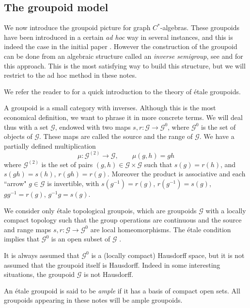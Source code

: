\documentclass[11pt]{amsart}
\theoremstyle{plain}            %
\theoremstyle{definition}       %
\theoremstyle{definition}       %
\theoremstyle{remark}
\begin{document}
\subsection{The groupoid model}

We now introduce the groupoid picture for graph $C^*$-algebras. These groupoids have been introduced in a certain {\it ad hoc} way in several instances, and this is indeed the case in the initial paper \cite{kprr97}. However the construction of the groupoid can be done from an algebraic structure called an {\it inverse semigroup}, see \cite{Exel08} and \cite{ExelBook} for this approach. This is the most satisfying way to build this structure, but we will restrict to the ad hoc method in these notes. 

We refer the reader to \cite{SimsCRMNotes} for a quick introduction to the theory of étale groupoids. 

A groupoid is a small category with inverses. Although this is the most economical definition, we want to phrase it in more concrete terms. We will deal thus with a set $\mathcal G$, endowed with two maps
$s,r\colon \mathcal G \to \mathcal G^0$, where $\mathcal G^0$ is the set of objects of $\mathcal G$. These maps are called the source and the range of $\mathcal G$. We have a partially defined multiplication 
$$\mu\colon \mathcal G ^{(2)}\to \mathcal G, \qquad \mu (g,h)= gh$$
where $\mathcal G ^{(2)}$ is the set of pairs $(g,h)\in \mathcal G\times \mathcal G$ such that $s(g)= r(h)$, and $s(gh)= s(h)$, $r(gh) = r(g)$. Moreover the product is associative and each ``arrow" $g\in \mathcal G$
is invertible, with $s(g^{-1})= r(g)$, $r(g^{-1})= s(g)$, $gg^{-1}= r(g)$, $g^{-1}g = s(g)$.  

We consider only étale topological groupois, which are groupoids $\mathcal G$ with a locally compact topology
such that the group operations are continuous and the source and range maps $s,r\colon \mathcal G \to \mathcal G^0$ are local homeomorphisms. The étale condition implies that $\mathcal G^0$ is an open subset of $\mathcal G$ \cite[Lemma 8.4.2]{SimsCRMNotes}. 

It is always assumed that $\mathcal G^0$ is a (locally compact) Hausdorff space, but it is not assumed that the groupoid itself is Hausdorff. Indeed in some interesting situations, the groupoid $\mathcal G$ is not Hausdorff. 

An étale groupoid is said to be {\it ample} if it has a basis of compact open sets. All groupoids appearing in these notes will be ample groupoids. 
\end{document}
